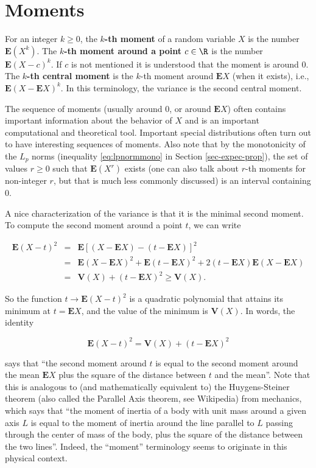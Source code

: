 \section{Moments}

For an integer $k\ge 0$, the \textbf{$k$-th moment} of a
random variable $X$ is the number $\mathbf{E}(X^k)$.
The \textbf{$k$-th moment around a point $c\in\R$} is the
number $\mathbf{E}(X-c)^k$. If $c$ is not mentioned
it is understood that the moment is around 0. The
\textbf{$k$-th central moment} is the $k$-th moment around
$\mathbf{E} X$ (when it exists), i.e.,
$\mathbf{E}(X-\mathbf{E} X)^k$. In this terminology,
the variance is the second central moment.

The sequence of moments (usually around 0, or around
$\mathbf{E} X$) often contains important information
about the behavior of $X$ and is an important
computational and theoretical tool. Important special
distributions often turn out to have interesting
sequences of moments. Also note that by the
monotonicity of the $L_p$ norms (inequality
\eqref{eq:lpnormmono} in Section \ref{sec-expec-prop}), the
set of values $r\ge 0$ such that $\mathbf{E}(X^r)$
exists (one can also talk about $r$-th moments for
non-integer $r$, but that is much less commonly
discussed) is an interval containing $0$.

A nice characterization of the variance is that it is
the minimal second moment. To compute the second
moment around a point $t$, we can write

\begin{eqnarray*}
\mathbf{E}(X-t)^2 &=& \mathbf{E}[ (X-\mathbf{E} X)-(t-\mathbf{E} X)]^2 \\ &=& \mathbf{E}(X-\mathbf{E} X)^2 + \mathbf{E}(t-\mathbf{E} X)^2 + 2(t-\mathbf{E} X) \mathbf{E}(X-\mathbf{E} X) \\
&=& \mathbf{V}(X) + (t-\mathbf{E} X)^2 \ge \mathbf{V}(X).
\end{eqnarray*}

\noindent So the function $t\to\mathbf{E}(X-t)^2$ is a
quadratic polynomial that attains its minimum at
$t=\mathbf{E} X$, and the value of the minimum is
$\mathbf{V}(X)$. In words, the identity

\[
\mathbf{E}(X-t)^2 = \mathbf{V}(X) + (t-\mathbf{E} X)^2
\]

\noindent says that ``the second moment around $t$ is equal to
the second moment around the mean $\mathbf{E} X$ plus
the square of the distance between $t$ and the
mean''. Note that this is analogous to (and
mathematically equivalent to) the Huygens-Steiner
theorem (also called the Parallel Axis theorem, see
Wikipedia) from mechanics, which says that ``the
moment of inertia of a body with unit mass around a
given axis $L$ is equal to the moment of inertia
around the line parallel to $L$ passing through the
center of mass of the body, plus the square of the
distance between the two lines''. Indeed, the
``moment'' terminology seems to originate in this
physical context.
